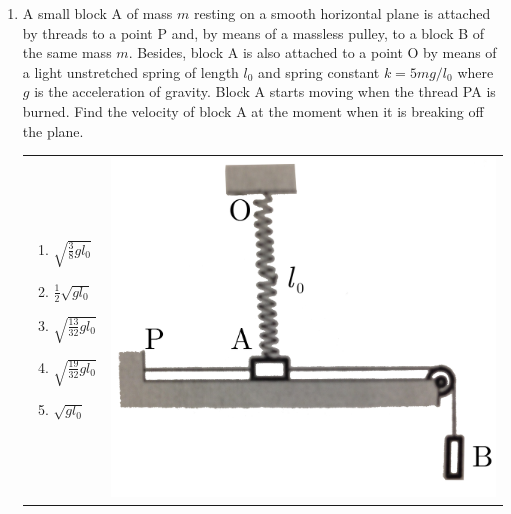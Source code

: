 \documentclass[12pt,letterpaper]{article}
\begin{document}
\begin{enumerate}[resume]
\item
A small block A of mass $m$ resting on a smooth horizontal plane is attached by threads to a point P and, by means of a massless pulley, to a block B of the same mass $m$. Besides, block A is also attached to a point O by means of a light unstretched spring of length $l_0$ and spring constant $k=5mg/l_0$ where $g$ is the acceleration of gravity. Block A starts moving when the thread PA is burned. Find the velocity of block A at the moment when it is breaking off the plane.

\begin{tabular}{l r}

\begin{minipage}{0.6\textwidth}
\begin{enumerate}
\item $\displaystyle \sqrt{\frac{3}{8}gl_0}$
\item $\displaystyle \frac{1}{2}\sqrt{gl_0}$
\item $\displaystyle \sqrt{\frac{13}{32}gl_0}$
\item $\displaystyle \sqrt{\frac{19}{32}gl_0}$
\item $\sqrt{gl_0}$
\end{enumerate}
\end{minipage} &
\begin{minipage}{0.3\textwidth}
\includegraphics[width=\textwidth]{thread.png}
\end{minipage}
\end{tabular}


\end{enumerate}
\end{document}
